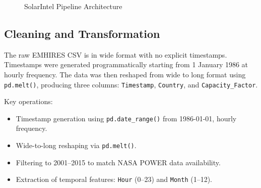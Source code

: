 \documentclass[12pt, a4paper]{article}
\begin{document}
\begin{figure}[H]
\caption{SolarIntel Pipeline Architecture}
\label{fig:pipeline}
\end{figure}

\subsection{Cleaning and Transformation}

The raw EMHIRES CSV is in wide format with no explicit timestamps. Timestamps were generated programmatically starting from 1 January 1986 at hourly frequency. The data was then reshaped from wide to long format using \texttt{pd.melt()}, producing three columns: \texttt{Timestamp}, \texttt{Country}, and \texttt{Capacity\_Factor}.

Key operations:
\begin{itemize}[noitemsep]
    \item Timestamp generation using \texttt{pd.date\_range()} from 1986-01-01, hourly frequency.
    \item Wide-to-long reshaping via \texttt{pd.melt()}.
    \item Filtering to 2001--2015 to match NASA POWER data availability.
    \item Extraction of temporal features: \texttt{Hour} (0--23) and \texttt{Month} (1--12).
\end{itemize}
\end{document}
